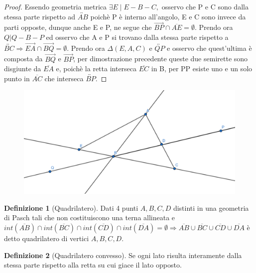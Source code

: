 \documentclass[a4paper,10pt]{article}
\theoremstyle{definition}
\theoremstyle{indentdefinition}
\newtheorem{defn}{Definizione}[section]
\theoremstyle{indentpostulate}
\theoremstyle{indenttheorem}
\theoremstyle{myremark}
\theoremstyle{indentgeneral}
\begin{document}
\begin{proof}   Essendo geometria metrica $\exists E\mid E-B-C,$ osservo che P e C sono dalla stessa parte rispetto ad $\overleftrightarrow{AB}$ poichè P è interno all'angolo, E e C sono invece da parti opposte, dunque anche E e P, ne segue che $\overrightarrow{BP} \cap \overline{AE}= \emptyset$. Prendo ora $Q|Q-B-P$ ed osservo che A e P si trovano dalla stessa parte rispetto a $\overleftrightarrow{BC}\Rightarrow \overrightarrow{EA} \cap \overrightarrow{BQ} = \emptyset$. Prendo ora $\Delta (E,A,C)$ e $\overleftrightarrow{QP}$ e osservo che quest'ultima è composta da $\overrightarrow{BQ}$ e $\overrightarrow{BP}$, per dimostrazione precedente queste due semirette sono disgiunte da $\overline{EA}$ e, poichè la retta interseca $\overline{EC}$ in B, per PP esiste uno e un solo punto in $\overline{AC}$ che interseca $\overleftrightarrow{BP}$.   \end{proof} 

\begin{figure}[H]
    \centering
    \includegraphics[scale=0.2]{Dimostrazione1.png}
\end{figure}

\begin{defn}[Quadrilatero]  Dati 4 punti $A,B,C,D$ distinti in una geometria di Pasch tali che non costituiscono una terna allineata e $int(\overline{AB})\cap int(\overline{BC}) \cap int(\overline{CD}) \cap int(\overline{DA})= \emptyset \Rightarrow \overline{AB} \cup \overline{BC} \cup \overline{CD} \cup \overline{DA}$ è detto quadrilatero di vertici $A,B,C,D$. \end{defn} 

\begin{defn}[Quadrilatero convesso]  Se ogni lato risulta interamente dalla stessa parte rispetto alla retta su cui giace il lato opposto.     \end{defn} 
\end{document}
